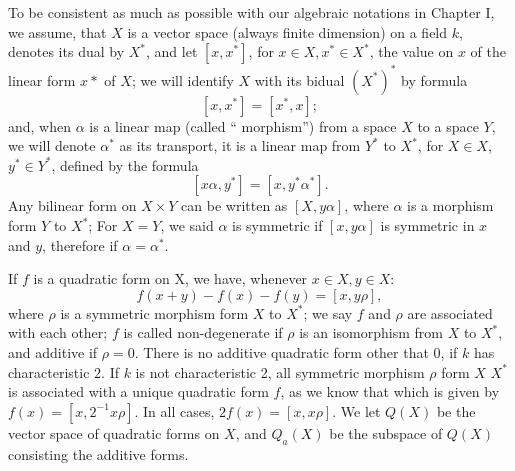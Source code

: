 \documentclass[12pt]{amsart}
\newcounter{ssection}
\renewcommand{\subsection}{
  \addtocounter{ssection}{1}{\bf  \arabic{ssection}.\  }}
\begin{document}
\subsection{}
To be consistent as much as possible with our algebraic notations in Chapter I,
we assume, that $X$ is a vector space (always finite dimension) on a field $k$,
denotes its dual by $X^*$, and let  $[x, x^*]$, for $x\in X, x^* \in X^*$,
the value on $x$ of the linear form $x*$ of $X$;
we will identify $X$ with its bidual $(X^*)^*$ 
by  formula 
\[
[x, x^*] = [x^*, x];
\]
and, when $\alpha$ is a linear map (called `` morphism'') from a space $X$ 
to a space $Y$, we will denote $\alpha^*$ as its transport, 
it is a linear map from $Y^*$ to $X^*$, for $X \in X$, $y^* \in Y^*$, 
defined by the formula 
\[
[x\alpha, y^*] = [x, y^*\alpha^*].
\]
Any bilinear form on $X\times Y$ can be written as $[X, y\alpha]$,
where $\alpha$ is a morphism form $Y$ to $X^*$;
For $X=Y$, we said $\alpha$ is symmetric if $[x, y\alpha]$
 is symmetric in $x$ and $y$, therefore if $\alpha=\alpha^*$.

If $f$ is a quadratic form on X, we have, whenever $x \in X, y \in X$: 
\[
f (x + y) -f(x) - f (y) = [x, y\rho], 
\]
where $\rho$ is a symmetric morphism form $X$ to $X^*$; we 
say $f$ and $\rho$ are associated with each other;
$f$ is called non-degenerate if $\rho$ is an isomorphism from $X$ to  $X^*$,
 and additive if $\rho=0$.
There is no additive quadratic form other that $0$, if $k$ has characteristic  $2$. 
If $k$ is not characteristic 2,  all symmetric morphism $\rho$ form $X$ $X^*$
is associated with a unique quadratic form $f$,
as we know that which is given by $f(x) = [x, 2^{-1}x\rho]$.
In all cases,  $2f(x)= [x, x\rho]$. We let $Q(X)$ 
be the vector space of quadratic forms on $X$,
 and $Q_a(X)$ be the subspace of $Q(X)$ consisting the additive forms. 
\end{document}
